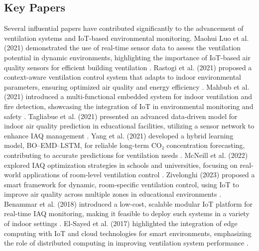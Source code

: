 \subsection{Key Papers}  
Several influential papers have contributed significantly to the advancement of ventilation systems and IoT-based environmental monitoring. Maohui Luo et al. (2021) demonstrated the use of real-time sensor data to assess the ventilation potential in dynamic environments, highlighting the importance of IoT-based air quality sensors for efficient building ventilation \cite{1}. Rastogi et al. (2021) proposed a context-aware ventilation control system that adapts to indoor environmental parameters, ensuring optimized air quality and energy efficiency \cite{2}. Mahbub et al. (2021) introduced a multi-functional embedded system for indoor ventilation and fire detection, showcasing the integration of IoT in environmental monitoring and safety \cite{3}. Tagliabue et al. (2021) presented an advanced data-driven model for indoor air quality prediction in educational facilities, utilizing a sensor network to enhance IAQ management \cite{4}. Yang et al. (2021) developed a hybrid learning model, BO–EMD–LSTM, for reliable long-term CO₂ concentration forecasting, contributing to accurate predictions for ventilation needs \cite{6}. McNeill et al. (2022) explored IAQ optimization strategies in schools and universities, focusing on real-world applications of room-level ventilation control \cite{7}. Zivelonghi (2023) proposed a smart framework for dynamic, room-specific ventilation control, using IoT to improve air quality across multiple zones in educational environments \cite{11}. Benammar et al. (2018) introduced a low-cost, scalable modular IoT platform for real-time IAQ monitoring, making it feasible to deploy such systems in a variety of indoor settings \cite{16}. El-Sayed et al. (2017) highlighted the integration of edge computing with IoT and cloud technologies for smart environments, emphasizing the role of distributed computing in improving ventilation system performance \cite{14}.





